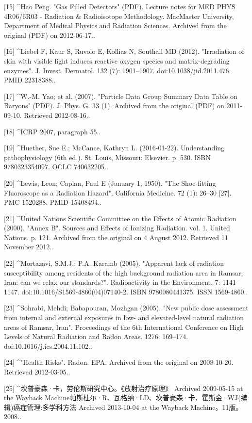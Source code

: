 [15]
^Hao Peng. "Gas Filled Detectors" (PDF). Lecture notes for MED PHYS 4R06/6R03 - Radiation & Radioisotope Methodology. MacMaster University, Department of Medical Physics and Radiation Sciences. Archived from the original (PDF) on 2012-06-17..

[16]
^Liebel F, Kaur S, Ruvolo E, Kollias N, Southall MD (2012). "Irradiation of skin with visible light induces reactive oxygen species and matrix-degrading enzymes". J. Invest. Dermatol. 132 (7): 1901–1907. doi:10.1038/jid.2011.476. PMID 22318388..

[17]
^W.-M. Yao; et al. (2007). "Particle Data Group Summary Data Table on Baryons" (PDF). J. Phys. G. 33 (1). Archived from the original (PDF) on 2011-09-10. Retrieved 2012-08-16..

[18]
^ICRP 2007, paragraph 55..

[19]
^Huether, Sue E.; McCance, Kathryn L. (2016-01-22). Understanding pathophysiology (6th ed.). St. Louis, Missouri: Elsevier. p. 530. ISBN 9780323354097. OCLC 740632205..

[20]
^Lewis, Leon; Caplan, Paul E (January 1, 1950). "The Shoe-fitting Fluoroscope as a Radiation Hazard". California Medicine. 72 (1): 26–30 [27]. PMC 1520288. PMID 15408494..

[21]
^United Nations Scientific Committee on the Effects of Atomic Radiation (2000). "Annex B". Sources and Effects of Ionizing Radiation. vol. 1. United Nations. p. 121. Archived from the original on 4 August 2012. Retrieved 11 November 2012..

[22]
^Mortazavi, S.M.J.; P.A. Karamb (2005). "Apparent lack of radiation susceptibility among residents of the high background radiation area in Ramsar, Iran: can we relax our standards?". Radioactivity in the Environment. 7: 1141–1147. doi:10.1016/S1569-4860(04)07140-2. ISBN 9780080441375. ISSN 1569-4860..

[23]
^Sohrabi, Mehdi; Babapouran, Mozhgan (2005). "New public dose assessment from internal and external exposures in low- and elevated-level natural radiation areas of Ramsar, Iran". Proceedings of the 6th International Conference on High Levels of Natural Radiation and Radon Areas. 1276: 169–174. doi:10.1016/j.ics.2004.11.102..

[24]
^"Health Risks". Radon. EPA. Archived from the original on 2008-10-20. Retrieved 2012-03-05..

[25]
^坎普豪森·卡，劳伦斯研究中心。《放射治疗原理》 Archived 2009-05-15 at the Wayback Machine帕斯杜尔·R、瓦格纳·LD、坎普豪森·卡、霍斯金·WJ(编辑)癌症管理:多学科方法 Archived 2013-10-04 at the Wayback Machine。11版。2008..

